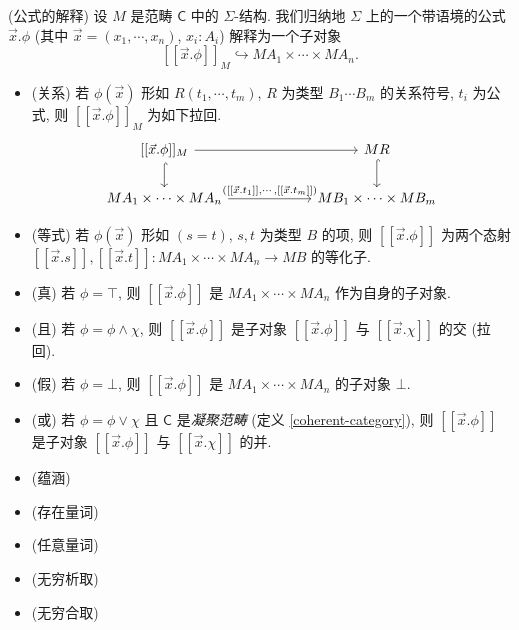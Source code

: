 \begin{definition}
	{(公式的解释)}
	设 $M$ 是范畴 $\mathsf C$ 中的 $\Sigma$-结构.
	我们归纳地 $\Sigma$ 上的一个带语境的公式 $\vec x.\phi$ (其中 $\vec x= (x_1,\cdots,x_n)$, $x_i\colon A_i$) 解释为一个子对象
	$$
	[[\vec x.\phi]]_M \hookrightarrow MA_1 \times \cdots \times MA_n.
	$$
	\begin{itemize}
		\item (关系) 若 $\phi(\vec x)$ 形如 $R(t_1,\cdots,t_m)$, $R$ 为类型 $B_1\cdots B_m$ 的关系符号, $t_i$ 为公式, 则
		$[[\vec x.\phi]]_M$ 为如下拉回.
		\[\begin{tikzcd}[ampersand replacement=\&,column sep=6em]
			{[[\vec x.\phi]]_M} \& MR \\
			{MA_1\times\cdots\times MA_n} \& {MB_1\times\cdots\times MB_m}
			\arrow["{([[\vec x.t_1]],\cdots,[[\vec x.t_m]])}", from=2-1, to=2-2]
			\arrow[hook, from=1-1, to=2-1]
			\arrow[from=1-1, to=1-2]
			\arrow[hook, from=1-2, to=2-2]
		\end{tikzcd}\]
		\item (等式) 若 $\phi(\vec x)$ 形如 $(s=t)$, $s,t$ 为类型 $B$ 的项, 则 $[[\vec x.\phi]]$ 为两个态射 $[[\vec x.s]],[[\vec x.t]]\colon MA_1\times\cdots\times MA_n \to MB$ 的等化子.
		\item (真) 若 $\phi = \top$, 则 $[[\vec x.\phi]]$ 是 $MA_1\times\cdots\times MA_n$ 作为自身的子对象.
		\item (且) 若 $\phi = \phi \wedge \chi$, 则 $[[\vec x.\phi]]$ 是子对象 $[[\vec x.\phi]]$ 与 $[[\vec x.\chi]]$ 的交 (拉回).
		\item (假) 若 $\phi = \bot$, 则 $[[\vec x.\phi]]$ 是 $MA_1\times\cdots\times MA_n$ 的子对象 $\bot$.
		\item (或) 若 $\phi = \phi \lor \chi$ 且 $\mathsf C$ 是\emph{凝聚范畴} (定义 \ref{coherent-category}),
		则 $[[\vec x.\phi]]$ 是子对象 $[[\vec x.\phi]]$ 与 $[[\vec x.\chi]]$ 的并.
		\item (蕴涵)
		\item (存在量词)
		\item (任意量词)
		\item (无穷析取)
		\item (无穷合取)
	\end{itemize}
\end{definition}

